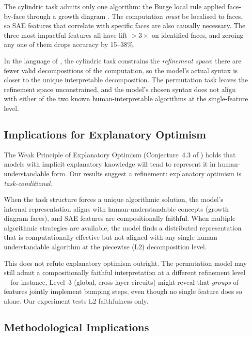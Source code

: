 \documentclass[10pt]{article}
\begin{document}
The cylindric task admits only one algorithm: the Burge local rule applied
face-by-face through a growth diagram \citep{langer2013}. The computation
\emph{must} be localised to faces, so SAE features that correlate with
specific faces are also causally necessary. The three most impactful features
all have lift $> 3\times$ on identified faces, and zeroing any one of them
drops accuracy by 15--38\%.

In the language of \citet{gauderis2026}, the cylindric task constrains the
\emph{refinement space}: there are fewer valid decompositions of the
computation, so the model's actual syntax is closer to the unique
interpretable decomposition. The permutation task leaves the refinement
space unconstrained, and the model's chosen syntax does not align with
either of the two known human-interpretable algorithms at the
single-feature level.

\subsection{Implications for Explanatory Optimism}

The Weak Principle of Explanatory Optimism (Conjecture~4.3 of
\citealt{gauderis2026}) holds that models with implicit explanatory knowledge
will tend to represent it in human-understandable form. Our results suggest a
refinement: explanatory optimism is \emph{task-conditional}.

When the task structure forces a unique algorithmic solution, the model's
internal representation aligns with human-understandable concepts (growth
diagram faces), and SAE features are compositionally faithful. When multiple
algorithmic strategies are available, the model finds a distributed
representation that is computationally effective but not aligned with any
single human-understandable algorithm at the piecewise (L2) decomposition
level.

This does not refute explanatory optimism outright. The permutation model
may still admit a compositionally faithful interpretation at a different
refinement level---for instance, Level~3 (global, cross-layer circuits) might
reveal that \emph{groups} of features jointly implement bumping steps, even
though no single feature does so alone. Our experiment tests L2 faithfulness
only.

\subsection{Methodological Implications}
\end{document}
